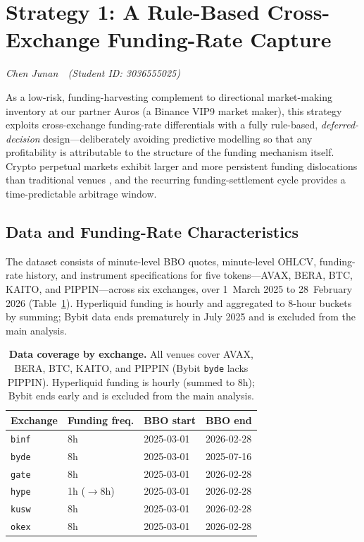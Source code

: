 \documentclass[10pt,twocolumn,a4paper]{article}
\newcommand{\partauthor}[2]{%
  \begingroup\par\vspace{-2pt}%
  {\small\itshape #1\ \ (Student ID: #2)}\par\vspace{4pt}\endgroup}
\begin{document}
\clearpage
\section{Strategy 1: A Rule-Based Cross-Exchange Funding-Rate Capture}
\label{sec:strat1}
\partauthor{Chen Junan}{3036555025}

As a low-risk, funding-harvesting complement to directional market-making
inventory at our partner Auros (a Binance VIP9 market maker), this strategy
exploits cross-exchange funding-rate differentials with a fully rule-based,
\emph{deferred-decision} design---deliberately avoiding predictive
modelling so that any profitability is attributable to the structure of the
funding mechanism itself.  Crypto perpetual markets exhibit larger and more
persistent funding dislocations than traditional venues
\cite{he2022perpetual, makarov2020trading}, and the recurring
funding-settlement cycle provides a time-predictable arbitrage window.

\subsection{Data and Funding-Rate Characteristics}

The dataset consists of minute-level BBO quotes, minute-level OHLCV,
funding-rate history, and instrument specifications for five
tokens---AVAX, BERA, BTC, KAITO, and PIPPIN---across six exchanges, over
1~March 2025 to 28~February 2026 (Table~\ref{tab:s1-coverage}).
Hyperliquid funding is hourly and aggregated to 8-hour buckets by summing;
Bybit data ends prematurely in July 2025 and is excluded from the main
analysis.

\begin{table}[H]
  \centering
  \caption{\textbf{Data coverage by exchange.}  All venues cover AVAX,
           BERA, BTC, KAITO, and PIPPIN (Bybit \texttt{byde} lacks PIPPIN).
           Hyperliquid funding is hourly (summed to 8h); Bybit ends early
           and is excluded from the main analysis.}
  \label{tab:s1-coverage}
  \begin{tabular}{llll}
    \toprule
    \textbf{Exchange} & \textbf{Funding freq.} & \textbf{BBO start} & \textbf{BBO end} \\
    \midrule
    \texttt{binf} & 8h            & 2025-03-01 & 2026-02-28 \\
    \texttt{byde} & 8h            & 2025-03-01 & 2025-07-16 \\
    \texttt{gate} & 8h            & 2025-03-01 & 2026-02-28 \\
    \texttt{hype} & 1h ($\to$8h)  & 2025-03-01 & 2026-02-28 \\
    \texttt{kusw} & 8h            & 2025-03-01 & 2026-02-28 \\
    \texttt{okex} & 8h            & 2025-03-01 & 2026-02-28 \\
    \bottomrule
  \end{tabular}
\end{table}
\end{document}
